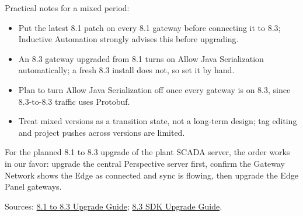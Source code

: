 Practical notes for a mixed period:
\begin{itemize}[itemsep=1pt]
  \item Put the latest 8.1 patch on every 8.1 gateway before connecting it to 8.3; Inductive Automation strongly advises this before upgrading.
  \item An 8.3 gateway upgraded from 8.1 turns on Allow Java Serialization automatically; a fresh 8.3 install does not, so set it by hand.
  \item Plan to turn Allow Java Serialization off once every gateway is on 8.3, since 8.3-to-8.3 traffic uses Protobuf.
  \item Treat mixed versions as a transition state, not a long-term design; tag editing and project pushes across versions are limited.
\end{itemize}
For the planned 8.1 to 8.3 upgrade of the plant SCADA server, the order works in our favor: upgrade the central Perspective server first, confirm the Gateway Network shows the Edge as connected and sync is flowing, then upgrade the Edge Panel gateways.

Sources: \href{https://www.docs.inductiveautomation.com/docs/8.3/getting-started/installing-and-upgrading/ignition-8-upgrade-guide/81to83-upgrade-guide}{8.1 to 8.3 Upgrade Guide}; \href{https://www.sdk-docs.inductiveautomation.com/docs/8.3/to-83-upgrade-guide/}{8.3 SDK Upgrade Guide}.

